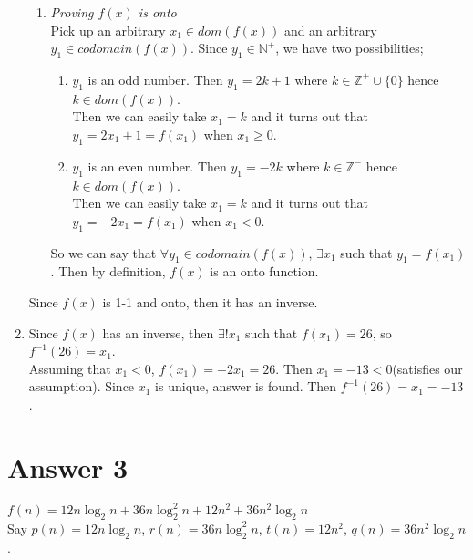 \documentclass[12pt]{article}
\begin{document}
\begin{enumerate}[label=(\alph*)]
\begin{enumerate}[label=(\roman*)]
	\item \textit{Proving $f(x)$ is onto}\\

		Pick up an arbitrary $x_1\in dom(f(x))$ and an arbitrary $y_1\in codomain(f(x))$.
		Since $y_1\in \mathbb{N^+}$, we have two possibilities;\\

		\begin{enumerate}[label=(\roman*)]

		\item $y_1$ is an odd number. Then $y_1=2k+1$ where $k\in \mathbb{Z^+}\cup \{0\}$ hence $k\in dom(f(x))$.\\ 
		Then we can easily take $x_1=k$ and it turns out that $y_1=2x_1+1=f(x_1)$ when $x_1\geq 0$.
		
		\item $y_1$ is an even number. Then $y_1=-2k$ where $k\in \mathbb{Z^-}$ hence $k\in dom(f(x))$.\\ 
		Then we can easily take $x_1=k$ and it turns out that $y_1=-2x_1=f(x_1)$ when $x_1< 0$.

		\end{enumerate}

		So we can say that $\forall y_1 \in codomain(f(x))$, $\exists x_1$ such that $y_1=f(x_1)$.
		Then by definition, $f(x)$ is an onto function.\\

	\end{enumerate}

	Since $f(x)$ is 1-1 and onto, then it has an inverse.\\

\item

	Since $f(x)$ has an inverse, then $\exists! x_1$ such that $f(x_1)=26$, so $f^{-1}(26)=x_1$.\\
	Assuming that $x_1< 0$, $f(x_1)=-2x_1=26$. Then $x_1=-13<0$(satisfies our assumption).
	Since $x_1$ is unique, answer is found. Then $f^{-1}(26)=x_1=-13$.

\end{enumerate}

\section*{Answer 3}

$f(n)=12n\log_2n+36n\log_2^{2}n+12n^2+36n^2\log_2n$\\

Say $p(n)=12n\log_2n$, $r(n)=36n\log_2^{2}n$, $t(n)=12n^2$, $q(n)=36n^2\log_2n$.
\end{document}
